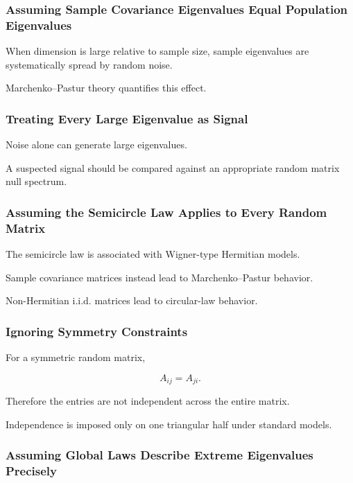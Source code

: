 \subsubsection{Assuming Sample Covariance Eigenvalues Equal Population Eigenvalues}

When dimension is large relative to sample size, sample eigenvalues are
systematically spread by random noise.

Marchenko--Pastur theory quantifies this effect.

\subsubsection{Treating Every Large Eigenvalue as Signal}

Noise alone can generate large eigenvalues.

A suspected signal should be compared against an appropriate random
matrix null spectrum.

\subsubsection{Assuming the Semicircle Law Applies to Every Random Matrix}

The semicircle law is associated with Wigner-type Hermitian models.

Sample covariance matrices instead lead to Marchenko--Pastur behavior.

Non-Hermitian i.i.d. matrices lead to circular-law behavior.

\subsubsection{Ignoring Symmetry Constraints}

For a symmetric random matrix,

\[
A_{ij}=A_{ji}.
\]

Therefore the entries are not independent across the entire matrix.

Independence is imposed only on one triangular half under standard
models.

\subsubsection{Assuming Global Laws Describe Extreme Eigenvalues Precisely}

